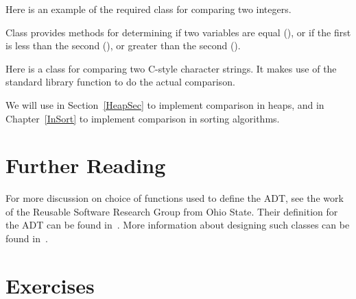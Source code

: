 {Here is an example of the required class for comparing two integers.


\noindent Class  provides methods for
determining if two  variables are equal (),
or if the first is less than the second (), or greater than
the second (). 

Here is a class for comparing two C-style character strings.
It makes use of the standard library function 
to do the actual comparison.

}{}

We will
use
in Section~\ref{HeapSec} to implement comparison in heaps,
and in Chapter~\ref{InSort} to implement comparison in sorting algorithms.

\section{Further Reading}

For more discussion on choice of functions used to define the
 ADT,
see the work of the
Reusable Software Research Group from Ohio State.
Their definition for the  ADT can be found
in~\cite{OhioStateADT}.
More information about designing such classes can be found
in~\cite{Resolve}.

\section{Exercises}

